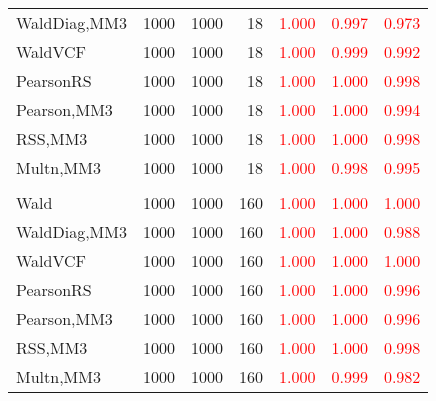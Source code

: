 \documentclass[
]{article}
\begin{document}
\begin{table}[H]
{\begin{tabular}[t]{lrrrrrr}
\hspace{1em}WaldDiag,MM3 & 1000 & 1000 & 18 & \textcolor{red}{1.000} & \textcolor{red}{0.997} & \textcolor{red}{0.973}\\
\hspace{1em}WaldVCF & 1000 & 1000 & 18 & \textcolor{red}{1.000} & \textcolor{red}{0.999} & \textcolor{red}{0.992}\\
\hspace{1em}PearsonRS & 1000 & 1000 & 18 & \textcolor{red}{1.000} & \textcolor{red}{1.000} & \textcolor{red}{0.998}\\
\hspace{1em}Pearson,MM3 & 1000 & 1000 & 18 & \textcolor{red}{1.000} & \textcolor{red}{1.000} & \textcolor{red}{0.994}\\
\hspace{1em}RSS,MM3 & 1000 & 1000 & 18 & \textcolor{red}{1.000} & \textcolor{red}{1.000} & \textcolor{red}{0.998}\\
\hspace{1em}Multn,MM3 & 1000 & 1000 & 18 & \textcolor{red}{1.000} & \textcolor{red}{0.998} & \textcolor{red}{0.995}\\
\addlinespace[0.3em]
\multicolumn{7}{l}{\textbf{3F 15V}}\\
\hspace{1em}Wald & 1000 & 1000 & 160 & \textcolor{red}{1.000} & \textcolor{red}{1.000} & \textcolor{red}{1.000}\\
\hspace{1em}WaldDiag,MM3 & 1000 & 1000 & 160 & \textcolor{red}{1.000} & \textcolor{red}{1.000} & \textcolor{red}{0.988}\\
\hspace{1em}WaldVCF & 1000 & 1000 & 160 & \textcolor{red}{1.000} & \textcolor{red}{1.000} & \textcolor{red}{1.000}\\
\hspace{1em}PearsonRS & 1000 & 1000 & 160 & \textcolor{red}{1.000} & \textcolor{red}{1.000} & \textcolor{red}{0.996}\\
\hspace{1em}Pearson,MM3 & 1000 & 1000 & 160 & \textcolor{red}{1.000} & \textcolor{red}{1.000} & \textcolor{red}{0.996}\\
\hspace{1em}RSS,MM3 & 1000 & 1000 & 160 & \textcolor{red}{1.000} & \textcolor{red}{1.000} & \textcolor{red}{0.998}\\
\hspace{1em}Multn,MM3 & 1000 & 1000 & 160 & \textcolor{red}{1.000} & \textcolor{red}{0.999} & \textcolor{red}{0.982}\\
\bottomrule
\end{tabular}}
\endgroup{}
\end{table}
\end{document}
